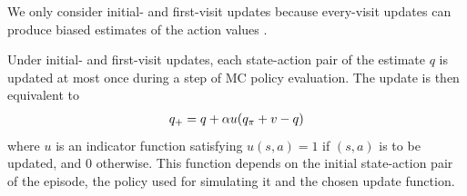 We only consider initial- and first-visit updates
because every-visit updates can produce biased estimates of the action values \cite[Theorem~7]{Singh1996ReinforcementTraces}.

Under initial- and first-visit updates, each state-action pair of the estimate $q$ is updated at most once during a step of MC policy evaluation.
The update is then equivalent to
\begin{align}
\label{eq: update q with chi}
    q_+ 
    =
    q + \alpha u ( q_\pi + v - q )
\end{align}
where $u$ is an indicator function satisfying $u(s,a)=1$ if $(s, a)$ is to be updated, and $0$ otherwise.
This function depends on the initial state-action pair of the episode, the policy used for simulating it and the chosen update function.





